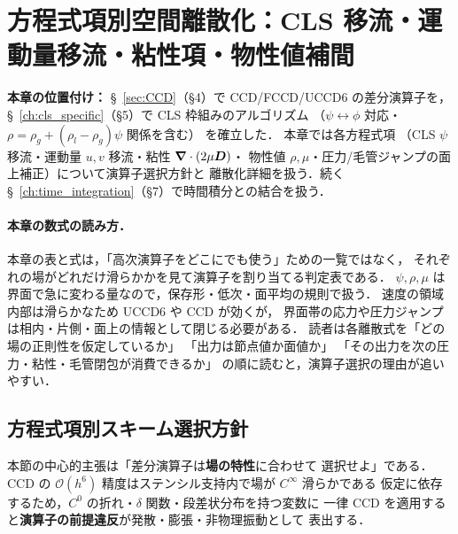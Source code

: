 %
%
\section{方程式項別空間離散化：CLS 移流・運動量移流・粘性項・物性値補間}
\label{ch:per_term_spatial}

\noindent\textbf{本章の位置付け：}
§~\ref{sec:CCD}（§4）で CCD/FCCD/UCCD6 の差分演算子を，
§~\ref{ch:cls_specific}（§5）で CLS 枠組みのアルゴリズム
（$\psi\leftrightarrow\phi$ 対応・$\rho=\rho_g+(\rho_l-\rho_g)\psi$ 関係を含む）
を確立した．
本章では各方程式項
（CLS $\psi$ 移流・運動量 $u,v$ 移流・粘性 $\bm{\nabla}\cdot(2\mu\bm{D})$・
物性値 $\rho,\mu$・圧力/毛管ジャンプの面上補正）について演算子選択方針と
離散化詳細を扱う．続く §~\ref{ch:time_integration}（§7）で時間積分との結合を扱う．

\paragraph{本章の数式の読み方．}
本章の表と式は，「高次演算子をどこにでも使う」ための一覧ではなく，
それぞれの場がどれだけ滑らかかを見て演算子を割り当てる判定表である．
$\psi,\rho,\mu$ は界面で急に変わる量なので，保存形・低次・面平均の規則で扱う．
速度の領域内部は滑らかなため UCCD6 や CCD が効くが，
界面帯の応力や圧力ジャンプは相内・片側・面上の情報として閉じる必要がある．
読者は各離散式を「どの場の正則性を仮定しているか」
「出力は節点値か面値か」
「その出力を次の圧力・粘性・毛管閉包が消費できるか」
の順に読むと，演算子選択の理由が追いやすい．

\subsection{方程式項別スキーム選択方針}
\label{sec:scheme_per_variable}

本節の中心的主張は「差分演算子は\textbf{場の特性}に合わせて
選択せよ」である．
CCD の $\mathcal{O}(h^6)$ 精度はステンシル支持内で場が $C^\infty$ 滑らかである
仮定に依存するため，$C^0$ の折れ・$\delta$ 関数・段差状分布を持つ変数に
一律 CCD を適用すると\textbf{演算子の前提違反}が発散・膨張・非物理振動として
表出する．

